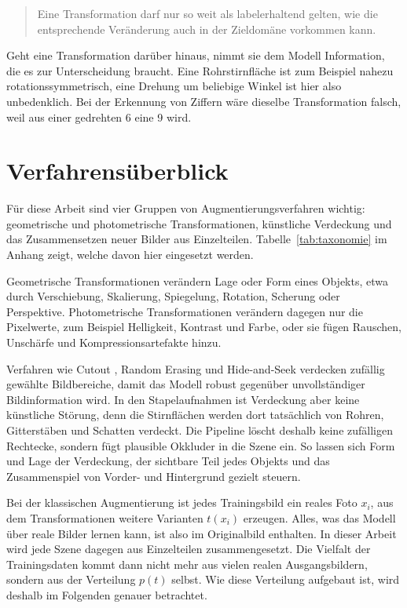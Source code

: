 \begin{quote}
  Eine Transformation darf nur so weit als labelerhaltend gelten, wie die
  entsprechende Veränderung auch in der Zieldomäne vorkommen kann.
\end{quote}

Geht eine Transformation darüber hinaus, nimmt sie dem Modell Information, die
es zur Unterscheidung braucht. Eine Rohrstirnfläche ist zum Beispiel nahezu
rotationssymmetrisch, eine Drehung um beliebige Winkel ist hier also
unbedenklich. Bei der Erkennung von Ziffern wäre dieselbe Transformation falsch,
weil aus einer gedrehten 6 eine 9 wird.

\section{Verfahrensüberblick}
\label{sec:aug-verfahren}

Für diese Arbeit sind vier Gruppen von Augmentierungsverfahren wichtig:
geometrische und photometrische Transformationen, künstliche Verdeckung und das
Zusammensetzen neuer Bilder aus Einzelteilen. Tabelle~\ref{tab:taxonomie} im
Anhang zeigt, welche davon hier eingesetzt werden.

Geometrische Transformationen verändern Lage oder Form eines Objekts, etwa durch
Verschiebung, Skalierung, Spiegelung, Rotation, Scherung oder Perspektive.
Photometrische Transformationen verändern dagegen nur die Pixelwerte, zum
Beispiel Helligkeit, Kontrast und Farbe, oder sie fügen Rauschen, Unschärfe und
Kompressionsartefakte hinzu.

Verfahren wie Cutout \parencite{devries2017cutout}, Random Erasing
\parencite{zhong2020erasing} und Hide-and-Seek \parencite{singh2017hideseek}
verdecken zufällig gewählte Bildbereiche, damit das Modell robust gegenüber
unvollständiger Bildinformation wird. In den Stapelaufnahmen ist Verdeckung
aber keine künstliche Störung, denn die Stirnflächen werden dort tatsächlich von
Rohren, Gitterstäben und Schatten verdeckt. Die Pipeline löscht deshalb keine
zufälligen Rechtecke, sondern fügt plausible Okkluder in die Szene ein. So
lassen sich Form und Lage der Verdeckung, der sichtbare Teil jedes Objekts und
das Zusammenspiel von Vorder- und Hintergrund gezielt steuern.

 Bei der klassischen Augmentierung ist jedes
Trainingsbild ein reales Foto $x_i$, aus dem Transformationen weitere Varianten
$t(x_i)$ erzeugen. Alles, was das Modell über reale Bilder lernen kann, ist also
im Originalbild enthalten. In dieser Arbeit wird jede Szene dagegen aus Einzelteilen
zusammengesetzt. Die Vielfalt der Trainingsdaten kommt dann nicht mehr aus
vielen realen Ausgangsbildern, sondern aus der Verteilung $p(t)$ selbst. Wie
diese Verteilung aufgebaut ist, wird deshalb im Folgenden genauer betrachtet.

